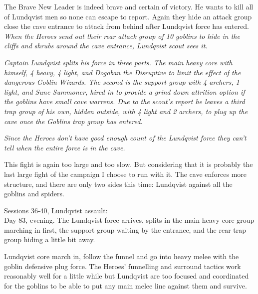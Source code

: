 The Brave New Leader is indeed brave and certain of victory. He wants to kill all of Lundqvist men so none can escape to report. Again they hide an attack group close the cave entrance to attack from behind after Lundqvist force has entered.
\textit{When the Heroes send out their rear attack group of 10 goblins to hide in the cliffs and shrubs around the cave entrance, Lundqvist scout sees it.}



\textit{
Captain Lundqvist splits his force in three parts. 
The main heavy core with himself, 4 heavy, 4 light, and Dogoban the Disruptive to limit the effect of the dangerous Goblin Wizards.
The second is the support group with 4 archers, 1 light, and Sune Summoner, hired in to provide a grind down attrition option if the goblins have small cave warrens. 
Due to the scout's report he leaves a third trap group of his own, hidden outside, with 4 light and 2 archers, to plug up the cave once the Goblins trap group has entered.}

\textit{Since the Heroes don't have good enough count of the Lundqvist force they can't tell when the entire force is in the cave.}


\begin{readoutloud}
This fight is again too large and too slow. But considering that it is probably the last large fight of the campaign I choose to run with it. The cave enforces more structure, and there are only two sides this time: Lundqvist against all the goblins and spiders.
\end{readoutloud}


Sessions 36-40, Lundqvist assault:\\
Day 83, evening. The Lundqvist force arrives, splits in the main heavy core group marching in first, the support group waiting by the entrance, and the rear trap group hiding a little bit away.

Lundqvist core march in, follow the funnel and go into heavy melee with the goblin defensive plug force. The Heroes' funnelling and surround tactics work reasonably well for a little while but Lundqvist are too focused and coordinated for the goblins to be able to put any main melee line against them and survive.

